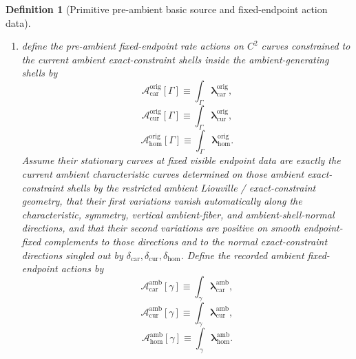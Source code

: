 \documentclass[11pt]{article}
\newcommand{\TensorConstraintGap}{\delta_{\mathrm{car}}}
\newcommand{\CurConstraintGap}{\delta_{\mathrm{cur}}}
\newcommand{\HomConstraintGap}{\delta_{\mathrm{hom}}}
\newcommand{\TensorAmbientRateForm}{\boldsymbol{\lambda}_{\mathrm{car}}^{\mathrm{amb}}}
\newcommand{\CurAmbientRateForm}{\boldsymbol{\lambda}_{\mathrm{cur}}^{\mathrm{amb}}}
\newcommand{\HomAmbientRateForm}{\boldsymbol{\lambda}_{\mathrm{hom}}^{\mathrm{amb}}}
\newcommand{\TensorAmbientAction}{\mathscr A_{\mathrm{car}}^{\mathrm{amb}}}
\newcommand{\CurAmbientAction}{\mathscr A_{\mathrm{cur}}^{\mathrm{amb}}}
\newcommand{\HomAmbientAction}{\mathscr A_{\mathrm{hom}}^{\mathrm{amb}}}
\newcommand{\TensorOriginRateForm}{\boldsymbol{\lambda}_{\mathrm{car}}^{\mathrm{orig}}}
\newcommand{\CurOriginRateForm}{\boldsymbol{\lambda}_{\mathrm{cur}}^{\mathrm{orig}}}
\newcommand{\HomOriginRateForm}{\boldsymbol{\lambda}_{\mathrm{hom}}^{\mathrm{orig}}}
\newcommand{\TensorOriginAction}{\mathscr A_{\mathrm{car}}^{\mathrm{orig}}}
\newcommand{\CurOriginAction}{\mathscr A_{\mathrm{cur}}^{\mathrm{orig}}}
\newcommand{\HomOriginAction}{\mathscr A_{\mathrm{hom}}^{\mathrm{orig}}}
\newtheorem{definition}{Definition}
\begin{document}
\begin{definition}[Primitive pre-ambient basic source and fixed-endpoint action data]
\begin{enumerate}
\begin{equation}
    \label{eq:ambient_boundary_from_origin}
    \end{equation}
    \item define the pre-ambient fixed-endpoint rate actions on \(C^2\) curves constrained to the current ambient exact-constraint shells inside the ambient-generating shells by
    \begin{equation}
    \TensorOriginAction[\Gamma]\equiv\int_\Gamma \TensorOriginRateForm,
    \label{eq:origin_action_car}
    \end{equation}
    \begin{equation}
    \CurOriginAction[\Gamma]\equiv\int_\Gamma \CurOriginRateForm,
    \label{eq:origin_action_cur}
    \end{equation}
    \begin{equation}
    \HomOriginAction[\Gamma]\equiv\int_\Gamma \HomOriginRateForm.
    \label{eq:origin_action_hom}
    \end{equation}
    Assume their stationary curves at fixed visible endpoint data are exactly the current ambient characteristic curves determined on those ambient exact-constraint shells by the restricted ambient Liouville / exact-constraint geometry, that their first variations vanish automatically along the characteristic, symmetry, vertical ambient-fiber, and ambient-shell-normal directions, and that their second variations are positive on smooth endpoint-fixed complements to those directions and to the normal exact-constraint directions singled out by \(\TensorConstraintGap,\CurConstraintGap,\HomConstraintGap\). Define the recorded ambient fixed-endpoint actions by
    \begin{equation}
    \TensorAmbientAction[\gamma]\equiv\int_\gamma \TensorAmbientRateForm,
    \label{eq:ambient_action_from_origin_car}
    \end{equation}
    \begin{equation}
    \CurAmbientAction[\gamma]\equiv\int_\gamma \CurAmbientRateForm,
    \label{eq:ambient_action_from_origin_cur}
    \end{equation}
    \begin{equation}
    \HomAmbientAction[\gamma]\equiv\int_\gamma \HomAmbientRateForm.
    \label{eq:ambient_action_from_origin_hom}
    \end{equation}
\end{enumerate}
\end{definition}
\end{document}
